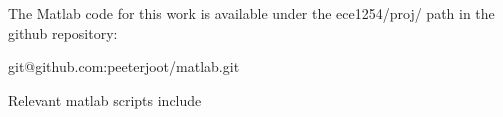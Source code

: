 %
%

\label{appendix:matlab}

The Matlab code for this work is available under the ece1254/proj/ path in the github repository:

\begin{center}
git@github.com:peeterjoot/matlab.git
\end{center}

Relevant matlab scripts include


